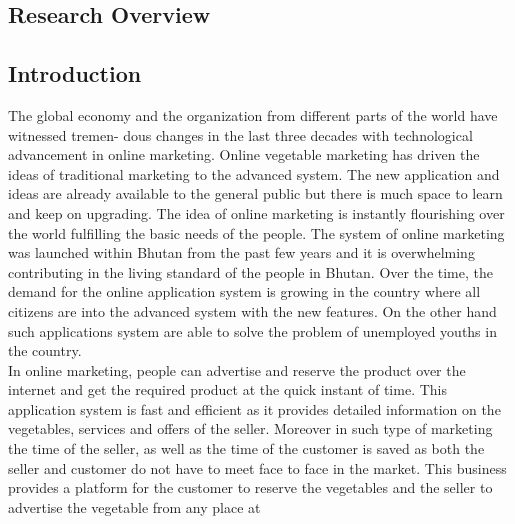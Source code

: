 \documentclass[12pt]{report}
\begin{document}

\tableofcontents			%

\newpage
	





\begin{normalsize}		
		
		


\chapter{Research Overview}
\label{chapter_overview}
\section{Introduction}
The global economy and the organization from different parts of the world have witnessed tremen-
dous changes in the last three decades with technological advancement in online marketing. Online
vegetable marketing has driven the ideas of traditional marketing to the advanced system. The
new application and ideas are already available to the general public but there is much space to
learn and keep on upgrading. The idea of online marketing is instantly flourishing over the world
fulfilling the basic needs of the people. The system of online marketing was launched within Bhutan
from the past few years and it is overwhelming contributing in the living standard of the people
in Bhutan. Over the time, the demand for the online application system is growing in the country
where all citizens are into the advanced system with the new features. On the other hand such
applications system are able to solve the problem of unemployed youths in the country.\newline\\[0.1cm]
In online marketing, people can advertise and reserve the product over the internet and get the
required product at the quick instant of time. This application system is fast and efficient as it
provides detailed information on the vegetables, services and offers of the seller. Moreover in such
type of marketing the time of the seller, as well as the time of the customer is saved as both the seller
and customer do not have to meet face to face in the market. This business provides a platform for
the customer to reserve the vegetables and the seller to advertise the vegetable from any place at

\end{normalsize}
\end{document}
